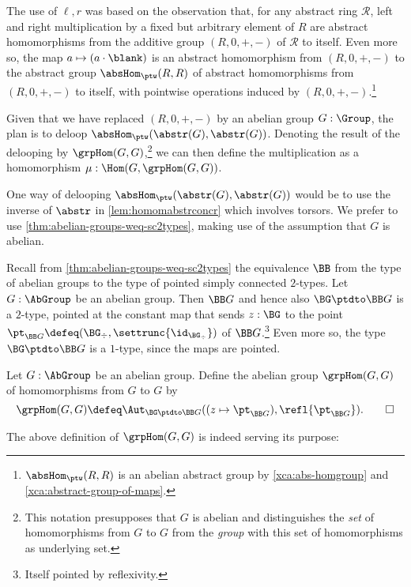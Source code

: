 The use of $\ell,r$ was based on the observation that, 
for any abstract ring $\mathscr R$, left and right multiplication
by a fixed but arbitrary element of $R$ are 
abstract homomorphisms from the additive group $(R,0,+,-)$ of 
$\mathscr R$ to itself. 
Even more so, the map $a\mapsto(a\cdot\blank)$ is an abstract homomorphism
from $(R,0,+,-)$ to the abstract group $\absHom_{\ptw}(R,R)$
of abstract homomorphisms from $(R,0,+,-)$ to itself, with
pointwise operations induced by $(R,0,+,-)$.\footnote{%
$\absHom_{\ptw}(R,R)$ is an abelian abstract group by
\cref{xca:abs-homgroup} and \cref{xca:abstract-group-of-maps}.}

Given that we have replaced $(R,0,+,-)$ by an abelian group $G:\Group$,
the plan is to deloop $\absHom_{\ptw}(\abstr(G),\abstr(G))$. 
Denoting the result of the delooping by $\grpHom(G,G)$,\footnote{%
This notation presupposes that $G$ is abelian and distinguishes 
the \emph{set} of homomorphisms from $G$ to $G$ from the \emph{group}
with this set of homomorphisms as underlying set.}
we can then define the multiplication as a homomorphism
$\mu: \Hom(G,\grpHom(G,G))$.

One way of delooping $\absHom_{\ptw}(\abstr(G),\abstr(G))$ would be
to use the inverse of $\abstr$ in \cref{lem:homomabstrconcr}
which involves torsors.  
We prefer to use \cref{thm:abelian-groups-weq-sc2types},
making use of the assumption that $G$ is abelian.

Recall from \cref{thm:abelian-groups-weq-sc2types} the equivalence
$\BB$ from the type of abelian groups to the type of pointed
simply connected $2$-types. Let $G:\AbGroup$ be an abelian group.
Then $\BB G$ and hence also $\BG\ptdto\BB G$ is a $2$-type, 
pointed at the constant map that sends
$z:\BG$ to the point $\pt_{\BB G}\defeq (\BG_\div,\settrunc{\id_{\BG_\div}})$ 
of $\BB G$.\footnote{Itself pointed by reflexivity.} Even more so,
the type $\BG\ptdto\BB G$ is a $1$-type, since the maps are pointed.



\begin{definition}\label{def:AbHomgroup}
Let $G:\AbGroup$ be an abelian group. Define the abelian group $\grpHom(G,G)$
of homomorphisms from $G$ to $G$ by 
\[
\grpHom(G,G) \defeq \Aut_{\BG\ptdto\BB G}
((z\mapsto \pt_{\BB G}),\refl{\pt_{\BB G}}).\qedhere
\]
\end{definition}

The above definition of $\grpHom(G,G)$ is indeed serving its purpose:

